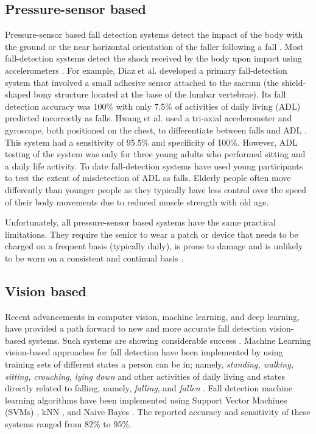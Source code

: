 \subsection{Pressure-sensor based}

Pressure-sensor based fall detection systems detect the impact of the body with the ground or the near horizontal orientation of the faller following a fall \cite{fda2007}. Most fall-detection systems detect the shock received by the body upon impact using accelerometers \cite{RN997}. For example, Diaz et al. \cite{RN1034} developed a primary fall-detection system that involved a small adhesive sensor attached to the sacrum (the shield-shaped bony structure located at the base of the lumbar vertebrae). Its fall detection accuracy was 100\% with only 7.5\% of activities of daily living (ADL) predicted incorrectly as falls. Hwang et al. used a tri-axial accelerometer and gyroscope, both positioned on the chest, to differentiate between falls and ADL \cite{RN1019}. This system had a sensitivity of 95.5\% and specificity of 100\%. However, ADL testing of the system was only for three young adults who performed sitting and a daily life activity. To date fall-detection systems have used young participants to test the extent of misdetection of ADL as falls. Elderly people often move differently than younger people as they typically have less control over the speed of their body movements due to reduced muscle strength with old age.

Unfortunately, all pressure-sensor based systems have the same practical limitations. They require the senior to wear a patch or device that needs to be charged on a frequent basis (typically daily), is prone to damage and is unlikely to be worn on a consistent and continual basis \cite{fda2007, RN1012, RN997, RN1019}.


\subsection{Vision based}
Recent advancements in computer vision, machine learning, and deep learning, have provided a path forward to new and more accurate fall detection vision-based systems. Such systems are showing considerable success \cite{samira2018, RN1017}.  Machine Learning vision-based approaches for fall detection have been implemented by using training sets of different states a person can be in; namely, \textit{standing, walking, sitting, crouching, lying down} and other activities of daily living and states directly related to falling, namely, \textit{falling}, and \textit{fallen} \cite{RN1007, Wang2017, Lustrek2009}.  Fall detection machine learning algorithms have been implemented using Support Vector Machines (SVMs) \cite{Doukas2007, Homa2008, Liang2018}, kNN \cite{Jian2019}, and Naive Bayes \cite{Muneeswari2020}. The reported accuracy and sensitivity of these systems ranged from 82\% to 95\%.

